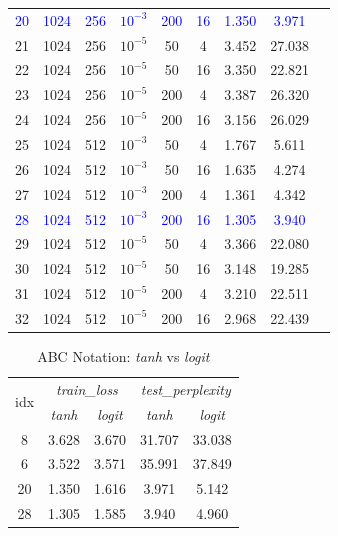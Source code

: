 \documentclass[twoside]{automatextcc}
\newcommand{\blue}[1]{\textcolor{blue}{#1}}
\begin{document}
\begin{table}[H]
{\begin{tabular}[t]{ccccccccc}
        \blue{20} & \blue{1024} & \blue{256} & \blue{$10^{-3}$} & \blue{200} & \blue{16} & \blue{1.350} & \blue{3.971} \\
        
        21 & 1024 & 256 & $10^{-5}$ & 50 & 4 & 3.452 & 27.038 \\
        22 & 1024 & 256 & $10^{-5}$ & 50 & 16 & 3.350 & 22.821 \\
        23 & 1024 & 256 & $10^{-5}$ & 200 & 4 & 3.387 & 26.320 \\
        24 & 1024 & 256 & $10^{-5}$ & 200 & 16 & 3.156 & 26.029 \\
        25 & 1024 & 512 & $10^{-3}$ & 50 & 4 & 1.767 & 5.611 \\
        26 & 1024 & 512 & $10^{-3}$ & 50 & 16 & 1.635 & 4.274 \\
        27 & 1024 & 512 & $10^{-3}$ & 200 & 4 & 1.361 & 4.342 \\
        
        \blue{28} & \blue{1024} & \blue{512} & \blue{$10^{-3}$} & \blue{200} & \blue{16} & \blue{1.305} & \blue{3.940} \\
        
        29 & 1024 & 512 & $10^{-5}$ & 50 & 4 & 3.366 & 22.080 \\
        30 & 1024 & 512 & $10^{-5}$ & 50 & 16 & 3.148 & 19.285 \\
        31 & 1024 & 512 & $10^{-5}$ & 200 & 4 & 3.210 & 22.511 \\
        32 & 1024 & 512 & $10^{-5}$ & 200 & 16 & 2.968 & 22.439 \\
        \bottomrule
        \end{tabular}
    }
\end{table}

\begin{table}[H]
    \label{tab:abcnotation_tanh_vs_logit}
    \caption{ABC Notation: \textit{tanh} vs \textit{logit}}
    \centering
    \begin{tabular}{c|cc|cc}
        \toprule
        \multirow{2}{*}{idx} &
        \multicolumn{2}{c}{\textit{train\_loss}} &
        \multicolumn{2}{c}{\textit{test\_perplexity}} \\
        & {\textit{tanh}} & {\textit{logit}} & {\textit{tanh}} & {\textit{logit}} \\
        \midrule
        8 & 3.628 & 3.670 & 31.707 & 33.038 \\
        6 & 3.522 & 3.571 & 35.991 & 37.849 \\
        20 & 1.350 & 1.616 & 3.971 & 5.142 \\
        28 & 1.305 & 1.585 & 3.940 & 4.960 \\
    \bottomrule
  \end{tabular}
\end{table}
\end{document}
